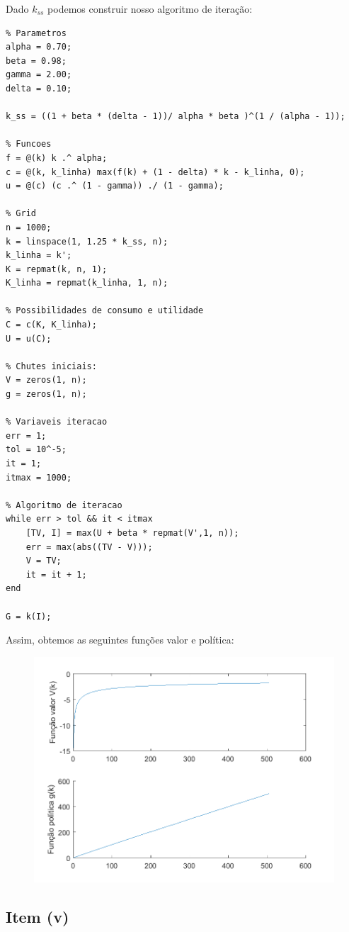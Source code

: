 \documentclass{article}
\begin{document}
Dado $k_{ss}$ podemos construir nosso algoritmo de iteração:

\begin{lstlisting}
% Parametros
alpha = 0.70;
beta = 0.98;
gamma = 2.00;
delta = 0.10;

k_ss = ((1 + beta * (delta - 1))/ alpha * beta )^(1 / (alpha - 1));

% Funcoes
f = @(k) k .^ alpha;
c = @(k, k_linha) max(f(k) + (1 - delta) * k - k_linha, 0);
u = @(c) (c .^ (1 - gamma)) ./ (1 - gamma);

% Grid
n = 1000;
k = linspace(1, 1.25 * k_ss, n);
k_linha = k';
K = repmat(k, n, 1);
K_linha = repmat(k_linha, 1, n);

% Possibilidades de consumo e utilidade
C = c(K, K_linha);
U = u(C);

% Chutes iniciais:
V = zeros(1, n);
g = zeros(1, n);

% Variaveis iteracao
err = 1;
tol = 10^-5;
it = 1;
itmax = 1000;

% Algoritmo de iteracao
while err > tol && it < itmax
    [TV, I] = max(U + beta * repmat(V',1, n));
    err = max(abs((TV - V)));
    V = TV;
    it = it + 1;
end

G = k(I);
\end{lstlisting}

Assim, obtemos as seguintes funções valor e política:

\begin{figure}[!h]
  \includegraphics{ex2_1.png}
\end{figure}

\subsection*{Item (v)}
\end{document}
